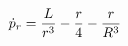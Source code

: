 \documentclass[preview]{standalone}
\begin{document}
\begin{align*}
\dot{p}_r={L\over r^3}-\frac{r}{4}-\frac{r}{R^3}
\end{align*}
\end{document}
